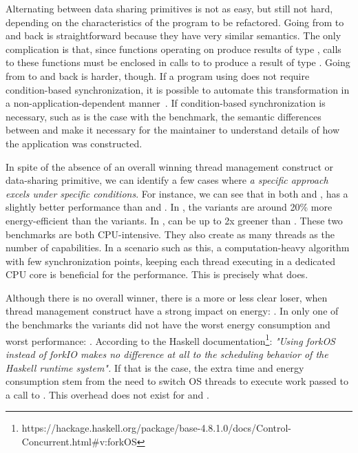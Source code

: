 Alternating between data sharing primitives is not as easy, but still not hard, depending on the characteristics of the program to be refactored. Going from \MVar to \TMVar and back is straightforward because they have very similar semantics. The only complication is that, since functions operating on \TMVar produce results of type \STM, calls to these functions must be enclosed in calls to \atomically to produce a result of type \IO. Going from \MVar to \TVar and back is harder, though. If a program using \MVar does not require condition-based synchronization, it is possible to automate this transformation in a non-application-dependent manner~\citep{soares-neto:2014}. If condition-based synchronization is necessary, such as is the case with the \dining benchmark, the semantic differences between \TVar and \MVar make it necessary for the maintainer to understand details of how the application was constructed.

In spite of the absence of an overall winning thread management construct or data-sharing primitive, we can identify a few cases where {\em a specific approach excels under specific conditions}. For instance, we can see that in both \mandelbrot and \spectral, \forkOn has a slightly better performance than \forkIO and \forkOS. In \mandelbrot, the \forkOn variants are around 20\% more energy-efficient than the \forkIO variants. In \spectral, \forkOn can be up to 2x greener than \forkOS. These two benchmarks are both CPU-intensive. They also create as many threads as the number of capabilities. In a scenario such as this, a computation-heavy algorithm with few synchronization points, keeping each thread executing in a dedicated CPU core is beneficial for the performance. This is precisely what \forkOn does.

Although there is no overall winner, there is a more or less clear loser, when thread management construct have a strong impact on energy: \forkOS. In only one of the benchmarks the \forkOS variants did not have the worst energy consumption and worst performance: \regex. According to the Haskell documentation\footnote{https://hackage.haskell.org/package/base-4.8.1.0/docs/Control-Concurrent.html\#v:forkOS}: \emph{"Using forkOS instead of forkIO makes no difference at all to the scheduling behavior of the Haskell runtime system".} If that is the case, the extra time and energy consumption stem from the need to switch OS threads to execute work passed to a call to \forkOS. This overhead does not exist for \forkOn and \forkIO.


